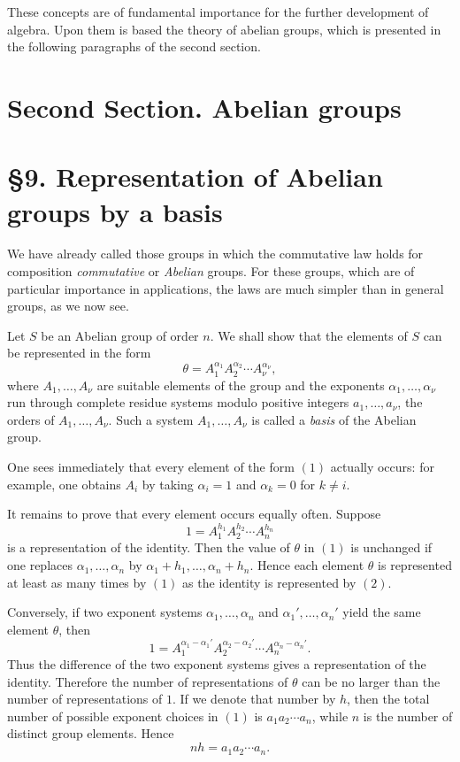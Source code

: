 \documentclass[11pt]{article}
\begin{document}
These concepts are of fundamental importance for the further development of algebra. Upon them is based the theory of abelian groups, which is presented in the following paragraphs of the second section.

\clearpage

\section*{Second Section. Abelian groups}

\section*{\S 9. Representation of Abelian groups by a basis}

We have already called those groups in which the commutative law holds for composition \emph{commutative} or \emph{Abelian} groups. For these groups, which are of particular importance in applications, the laws are much simpler than in general groups, as we now see.

Let \(S\) be an Abelian group of order \(n\). We shall show that the elements of \(S\) can be represented in the form
\[
\theta=A_1^{\alpha_1}A_2^{\alpha_2}\cdots A_\nu^{\alpha_\nu},
\tag{1}
\]
where \(A_1,\dots,A_\nu\) are suitable elements of the group and the exponents \(\alpha_1,\dots,\alpha_\nu\) run through complete residue systems modulo positive integers \(a_1,\dots,a_\nu\), the orders of \(A_1,\dots,A_\nu\). Such a system \(A_1,\dots,A_\nu\) is called a \emph{basis} of the Abelian group.

One sees immediately that every element of the form \((1)\) actually occurs: for example, one obtains \(A_i\) by taking \(\alpha_i=1\) and \(\alpha_k=0\) for \(k\neq i\).

It remains to prove that every element occurs equally often. Suppose
\[
1=A_1^{h_1}A_2^{h_2}\cdots A_n^{h_n}
\tag{2}
\]
is a representation of the identity. Then the value of \(\theta\) in \((1)\) is unchanged if one replaces \(\alpha_1,\dots,\alpha_n\) by \(\alpha_1+h_1,\dots,\alpha_n+h_n\). Hence each element \(\theta\) is represented at least as many times by \((1)\) as the identity is represented by \((2)\).

Conversely, if two exponent systems \(\alpha_1,\dots,\alpha_n\) and \(\alpha_1',\dots,\alpha_n'\) yield the same element \(\theta\), then
\[
1=A_1^{\alpha_1-\alpha_1'}A_2^{\alpha_2-\alpha_2'}\cdots A_n^{\alpha_n-\alpha_n'}.
\tag{3}
\]
Thus the difference of the two exponent systems gives a representation of the identity. Therefore the number of representations of \(\theta\) can be no larger than the number of representations of \(1\). If we denote that number by \(h\), then the total number of possible exponent choices in \((1)\) is \(a_1a_2\cdots a_n\), while \(n\) is the number of distinct group elements. Hence
\[
nh=a_1a_2\cdots a_n.
\tag{4}
\]
\end{document}
